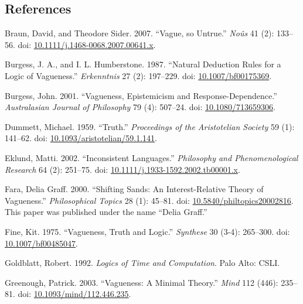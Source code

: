 \documentclass[
  10pt,
  letterpaper,
  DIV=11,
  numbers=noendperiod,
  twoside]{scrartcl}
\newlength{\cslhangindent}
\newenvironment{CSLReferences}[2] %
 {\begin{list}{}{%
  \setlength{\itemindent}{0pt}
  \setlength{\leftmargin}{0pt}
  \setlength{\parsep}{0pt}
  \ifodd #1
   \setlength{\leftmargin}{\cslhangindent}
   \setlength{\itemindent}{-1\cslhangindent}
  \fi
  \setlength{\itemsep}{#2\baselineskip}}}
 {\end{list}}
\begin{document}
\subsection*{References}\label{references}

\label{refs}
\begin{CSLReferences}{1}{0}
Braun, David, and Theodore Sider. 2007. {``Vague, so Untrue.''}
\emph{No{û}s} 41 (2): 133--56. doi:
\href{https://doi.org/10.1111/j.1468-0068.2007.00641.x}{10.1111/j.1468-0068.2007.00641.x}.

Burgess, J. A., and I. L. Humberstone. 1987. {``Natural Deduction Rules
for a Logic of Vagueness.''} \emph{Erkenntnis} 27 (2): 197--229. doi:
\href{https://doi.org/10.1007/bf00175369}{10.1007/bf00175369}.

Burgess, John. 2001. {``Vagueness, Epistemicism and
Response-Dependence.''} \emph{Australasian Journal of Philosophy} 79
(4): 507--24. doi:
\href{https://doi.org/10.1080/713659306}{10.1080/713659306}.

Dummett, Michael. 1959. {``Truth.''} \emph{Proceedings of the
Aristotelian Society} 59 (1): 141--62. doi:
\href{https://doi.org/10.1093/aristotelian/59.1.141}{10.1093/aristotelian/59.1.141}.

Eklund, Matti. 2002. {``Inconsistent Languages.''} \emph{Philosophy and
Phenomenological Research} 64 (2): 251--75. doi:
\href{https://doi.org/10.1111/j.1933-1592.2002.tb00001.x}{10.1111/j.1933-1592.2002.tb00001.x}.

Fara, Delia Graff. 2000. {``Shifting Sands: An Interest-Relative Theory
of Vagueness.''} \emph{Philosophical Topics} 28 (1): 45--81. doi:
\href{https://doi.org/10.5840/philtopics20002816}{10.5840/philtopics20002816}.
This paper was published under the name {``Delia Graff.''}

Fine, Kit. 1975. {``Vagueness, Truth and Logic.''} \emph{Synthese} 30
(3-4): 265--300. doi:
\href{https://doi.org/10.1007/bf00485047}{10.1007/bf00485047}.

Goldblatt, Robert. 1992. \emph{Logics of Time and Computation}. Palo
Alto: CSLI.

Greenough, Patrick. 2003. {``Vagueness: A Minimal Theory.''} \emph{Mind}
112 (446): 235--81. doi:
\href{https://doi.org/10.1093/mind/112.446.235}{10.1093/mind/112.446.235}.


\end{CSLReferences}
\end{document}
